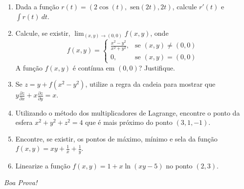 \documentclass[a4paper,5pt]{amsbook}
\newcommand{\sen}{\text{\ sen}}
\newcommand{\ds}{\displaystyle}
\begin{document}
\vspace{0.2cm}
\begin{enumerate}

\item Dada a fun\c{c}\~ao $r(t) = (2\cos(t), \sen(2t), 2t)$, calcule $r'(t)$ e $\ds\int r(t)\ dt$.
\vspace{0.5cm}

\item Calcule, se existir, $\ds\lim_{(x,y)\rightarrow(0,0)} f(x,y)$, onde 
	$$f(x,y) = \left\{
		\begin{array}{cl}
			\ds\frac{x^2-y^2}{x^2+y^2}, & \mbox{se } (x,y) \neq (0,0) \\
			0, & \mbox{se } (x,y) = (0,0)
		\end{array}\right.$$
	A fun\c{c}\~ao $f(x,y)$ \'e cont\'inua em $(0,0)$? Justifique.
\vspace{0.5cm}

\item Se $z=y+f(x^2-y^2)$, utilize a regra da cadeia para mostrar que $y\ds\frac{\partial z}{\partial x} + x\ds\frac{\partial z}{\partial y} = x$.
\vspace{0.5cm}

\item Utilizando o m\'etodo dos multiplicadores de Lagrange, encontre o ponto da esfera $x^2+y^2+z^2=4$ que \'e mais pr\'oximo do ponto $(3,1,-1)$.
\vspace{0.5cm}

\item Encontre, se existir, os pontos de m\'aximo, m\'inimo e sela da fun\c{c}\~ao
	$f(x,y) = xy + \ds\frac{1}{x} +\ds\frac{1}{y}$.
\vspace{0.25cm}

\item Linearize a fun\c{c}\~ao $f(x,y) = 1+x\ln(xy-5)$ no ponto $(2,3)$.

\end{enumerate}

\begin{flushright}
	\textit{Boa Prova!}
\end{flushright}
\end{document}
